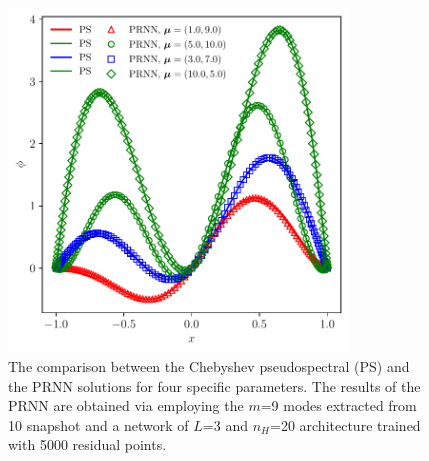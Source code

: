 \documentclass[preprint, 10pt]{elsarticle}
\begin{document}
\begin{figure}[!ht]
  \centering
  \includegraphics[width=9cm]{../../pythonNN/1DBurges/fig/ResultComparsion.pdf}
\caption{The comparison between the Chebyshev pseudospectral (PS) and the PRNN solutions for four specific parameters. The results of the PRNN are obtained via employing the $m$=9 modes extracted from 10 snapshot and a network of $L$=3 and $n_H$=20 architecture trained with 5000 residual points.}
\label{fig_1DBurgesResultComparsion}
\end{figure}
\end{document}
